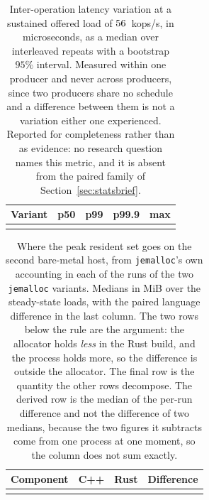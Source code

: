 \documentclass[english,oneside,a4paper,censored,csm,software-track-2020]{HYthesisML}
\begin{document}
\begin{appendices}
\begin{table}[ht]
\centering
\small
\caption[How much the delay changes from one call to the next]{Inter-operation latency variation at a
sustained offered load of $56$~kops/s, in microseconds, as a median over \NRepeats{}
interleaved repeats with a bootstrap $95\%$ interval. Measured within one producer and never across
producers, since two producers share no schedule and a difference between them is not a variation
either one experienced. Reported for completeness rather than as evidence: no research question
names this metric, and it is absent from the paired family of
Section~\ref{sec:statsbrief}.\label{tab:jitter}}
\begin{tabular}{@{}l r r r r@{}}
\hline\hline
Variant & p50 & p99 & p99.9 & max \\
\hline
\\
\hline
\end{tabular}
\end{table}

\begin{table}[ht]
\centering
\small
\caption[Where the process's extra memory sits]{Where the peak resident set goes on the
second bare-metal host, from \texttt{jemalloc}'s own accounting in each of the \BmJeRuns{} runs of
the two \texttt{jemalloc} variants. Medians in MiB over the steady-state loads, with the paired language
difference in the last column. The two rows below the rule are the argument: the allocator holds
\emph{less} in the Rust build, and the process holds more, so the difference is outside the
allocator. The final row is the quantity the other rows decompose. The derived row is the median of
the per-run difference and not the difference of two medians, because the two figures it subtracts
come from one process at one moment, so the column does not sum
exactly.\label{tab:resident}}
\begin{tabular}{@{}l r r r@{}}
\hline\hline
Component & C++ & Rust & Difference \\
\hline
\\
\hline
\end{tabular}
\end{table}


\end{appendices}
\end{document}
